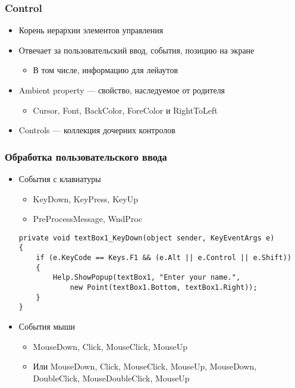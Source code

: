 \documentclass[xetex,mathserif,serif]{beamer}
\begin{document}
    \begin{frame}
        \frametitle{Control}
        \begin{itemize}
            \item Корень иерархии элементов управления
            \item Отвечает за пользовательский ввод, события, позицию на экране
            \begin{itemize}
                \item В том числе, информацию для лейаутов
            \end{itemize}
            \item Ambient property --- свойство, наследуемое от родителя
            \begin{itemize}
                \item Cursor, Font, BackColor, ForeColor и RightToLeft
            \end{itemize}
            \item Controls --- коллекция дочерних контролов
        \end{itemize}
    \end{frame}

    \begin{frame}[fragile]
        \frametitle{Обработка пользовательского ввода}
        \begin{itemize}
            \item События с клавиатуры
            \begin{itemize}
                \item KeyDown, KeyPress, KeyUp
                \item PreProcessMessage, WndProc
            \end{itemize}
            \begin{scriptsize}
                \begin{verbatim}
private void textBox1_KeyDown(object sender, KeyEventArgs e)
{
    if (e.KeyCode == Keys.F1 && (e.Alt || e.Control || e.Shift))
    {
        Help.ShowPopup(textBox1, "Enter your name.", 
            new Point(textBox1.Bottom, textBox1.Right));
    }
}
                \end{verbatim}
            \end{scriptsize}
            \item События мыши
            \begin{itemize}
                \item MouseDown, Click, MouseClick, MouseUp
                \item Или MouseDown, Click, MouseClick, MouseUp, MouseDown, DoubleClick, MouseDoubleClick, MouseUp
            \end{itemize}
        \end{itemize}
    \end{frame}
\end{document}
